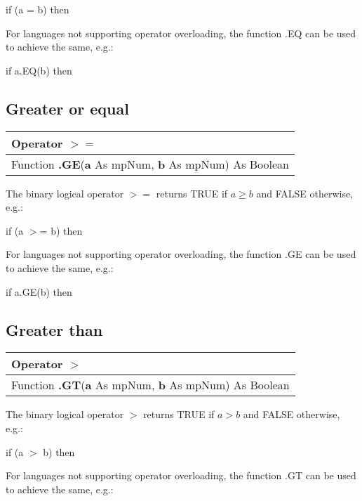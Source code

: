 \textsf{if (a = b) then}

For languages not supporting operator overloading, the function \textsf{.EQ} can be used to achieve the same, e.g.: 

\textsf{if a.EQ(b) then}






\subsection{Greater or equal}
\begin{tabular}{p{481pt}}
	\toprule
	\textsf{Operator $\boldsymbol{>=}$}\index{Multiprecision Functions!=} \\
	\midrule
	\textsf{Function \textbf{.GE}(\textbf{a} As mpNum, \textbf{b} As mpNum) As Boolean}\index{Multiprecision Functions!.GE} \\
	\bottomrule
\end{tabular}

\vspace{0.3cm}
The binary logical operator $\boldsymbol{>=}$ returns TRUE if  $a \geq b$ and FALSE otherwise, e.g.: 

\textsf{if (a $>$= b) then}

For languages not supporting operator overloading, the function \textsf{.GE} can be used to achieve the same, e.g.: 

\textsf{if a.GE(b) then}




\subsection{Greater than}
\begin{tabular}{p{481pt}}
	\toprule
	\textsf{Operator $\boldsymbol{>}$}\index{Multiprecision Functions!=} \\
	\midrule
	\textsf{Function \textbf{.GT}(\textbf{a} As mpNum, \textbf{b} As mpNum) As Boolean}\index{Multiprecision Functions!.GT} \\
	\bottomrule
\end{tabular}

\vspace{0.3cm}
The binary logical operator $\boldsymbol{>}$ returns TRUE if  $a > b$ and FALSE otherwise, e.g.: 

\textsf{if (a $>$ b) then}

For languages not supporting operator overloading, the function \textsf{.GT} can be used to achieve the same, e.g.: 

